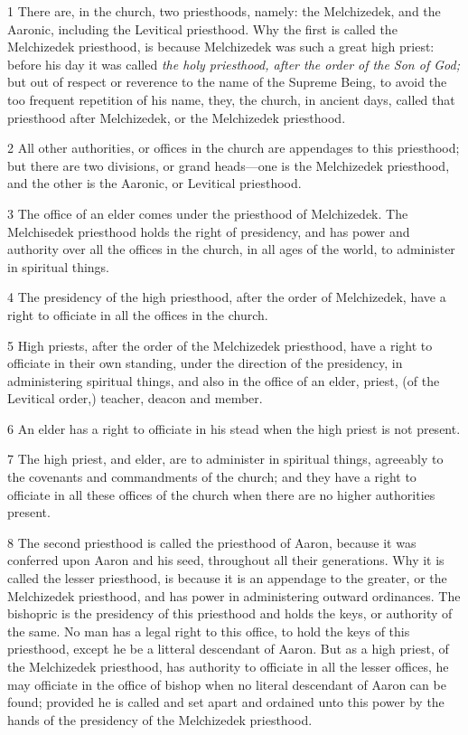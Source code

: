 				1 There are, in the church, two priesthoods, namely: the Melchizedek, and the Aaronic, including the Levitical priesthood. Why the first is called the Melchizedek priesthood, is because Melchizedek was such a great high priest: before his day it was called \textit{the holy priesthood, after the order of the Son of God;} but out of respect or reverence to the name of the Supreme Being, to avoid the too frequent repetition of his name, they, the church, in ancient days, called that priesthood after Melchizedek, or the Melchizedek priesthood.

				2 All other authorities, or offices in the church are appendages to this priesthood; but there are two divisions, or grand heads---one is the Melchizedek priesthood, and the other is the Aaronic, or Levitical priesthood.

				3 The office of an elder comes under the priesthood of Melchizedek. The Melchisedek priesthood holds the right of presidency, and has power and authority over all the offices in the church, in all ages of the world, to administer in spiritual things.

				4 The presidency of the high priesthood, after the order of Melchizedek, have a right to officiate in all the offices in the church.

				5 High priests, after the order of the Melchizedek priesthood, have a right to officiate in their own standing, under the direction of the presidency, in administering spiritual things, and also in the office of an elder, priest, (of the Levitical order,) teacher, deacon and member.

				6 An elder has a right to officiate in his stead when the high priest is not present.

				7 The high priest, and elder, are to administer in spiritual things, agreeably to the covenants and commandments of the church; and they have a right to officiate in all these offices of the church when there are no higher authorities present.

				8 The second priesthood is called the priesthood of Aaron, because it was conferred upon Aaron and his seed, throughout all their generations. Why it is called the lesser priesthood, is because it is an appendage to the greater, or the Melchizedek priesthood, and has power in administering outward ordinances. The bishopric is the presidency of this priesthood and holds the keys, or authority of the same. No man has a legal right to this office, to hold the keys of this priesthood, except he be a litteral descendant of Aaron. But as a high priest, of the Melchizedek priesthood, has authority to officiate in all the lesser offices, he may officiate in the office of bishop when no literal descendant of Aaron can be found; provided he is called and set apart and ordained unto this power by the hands of the presidency of the Melchizedek priesthood.

